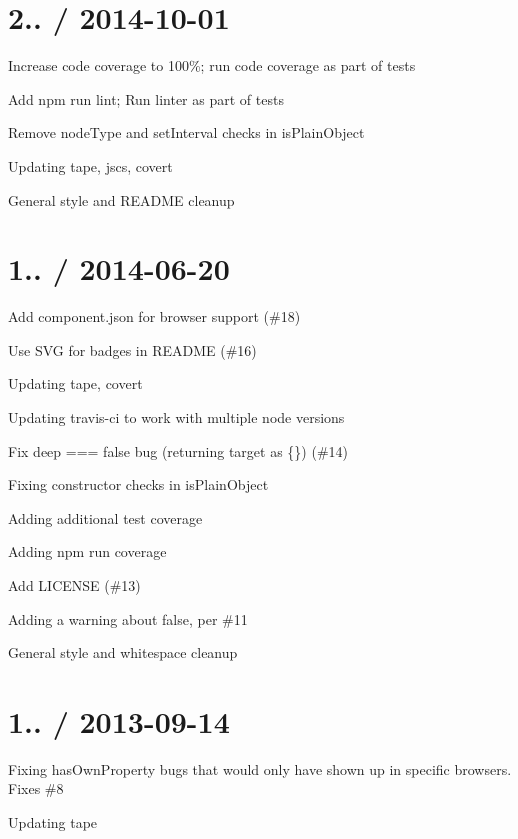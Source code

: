 \section*{2.. / 2014-\/10-\/01 }


\begin{DoxyItemize}
\item Increase code coverage to 100\%; run code coverage as part of tests
\item Add {\ttfamily npm run lint}; Run linter as part of tests
\item Remove node\+Type and set\+Interval checks in is\+Plain\+Object
\item Updating {\ttfamily tape}, {\ttfamily jscs}, {\ttfamily covert}
\item General style and R\+E\+A\+D\+ME cleanup
\end{DoxyItemize}

\section*{1.. / 2014-\/06-\/20 }


\begin{DoxyItemize}
\item Add component.\+json for browser support (\#18)
\item Use S\+VG for badges in R\+E\+A\+D\+ME (\#16)
\item Updating {\ttfamily tape}, {\ttfamily covert}
\item Updating travis-\/ci to work with multiple node versions
\item Fix {\ttfamily deep === false} bug (returning target as \{\}) (\#14)
\item Fixing constructor checks in is\+Plain\+Object
\item Adding additional test coverage
\item Adding {\ttfamily npm run coverage}
\item Add L\+I\+C\+E\+N\+SE (\#13)
\item Adding a warning about {\ttfamily false}, per \#11
\item General style and whitespace cleanup
\end{DoxyItemize}

\section*{1.. / 2013-\/09-\/14 }


\begin{DoxyItemize}
\item Fixing has\+Own\+Property bugs that would only have shown up in specific browsers. Fixes \#8
\item Updating {\ttfamily tape}
\end{DoxyItemize}

